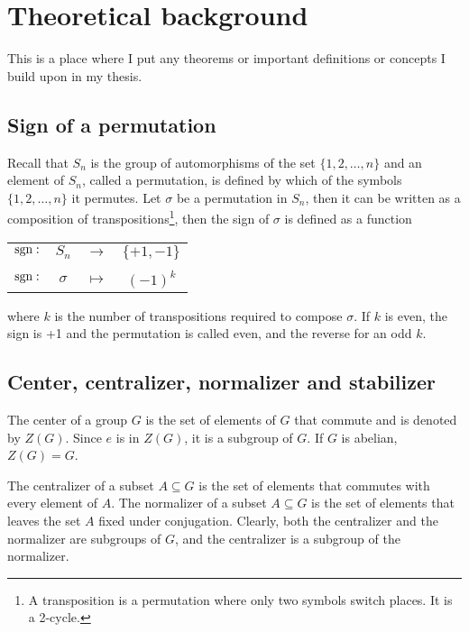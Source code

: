 \clearpage{\thispagestyle{empty}}
\section{Theoretical background}
	
	This is a place where I put any theorems or important definitions or concepts I build upon in my thesis.
	
	\subsection{Sign of a permutation}

		Recall that $S_n$ is the group of automorphisms of the set $\{1, 2, \dots, n\}$ and an element of $S_n$, called a permutation, is defined by which of the symbols $\{1, 2, \dots, n\}$ it permutes. Let $\sigma$ be a permutation in $S_n$, then it can be written as a composition of transpositions\footnote{A transposition is a permutation where only two symbols switch places. It is a 2-cycle.}, then the sign of $\sigma$ is defined as a function
		\begin{table}[hbt!]\centering\begin{tabular}{c c c c}
			$\text{sgn}:$ & $S_n$    & $\rightarrow$ & $\{+1, -1\}$ \\
			&\rotatebox[origin=c]{90}{$\in$}&&\rotatebox[origin=c]{90}{$\in$} \\
			$\text{sgn}:$ & $\sigma$ & $\mapsto$     & $(-1)^k$
		\end{tabular}\end{table}
		where $k$ is the number of transpositions required to compose $\sigma$. If $k$ is even, the sign is +1 and the permutation is called even, and the reverse for an odd $k$.
		
	\subsection{Center, centralizer, normalizer and stabilizer}
	
		\cite{DummitFoote}
	
		\begin{example}[Center]
			The center of a group $G$ is the set of elements of $G$ that commute and is denoted by $Z(G)$. Since $e$ is in $Z(G)$, it is a subgroup of $G$. If $G$ is abelian, $Z(G) = G$.	
		\end{example}
		
		\begin{example}
			The centralizer of a subset $A \subseteq G$ is the set of elements that commutes with every element of $A$.
			The normalizer of a subset $A \subseteq G$ is the set of elements that leaves the set $A$ fixed  under conjugation. Clearly, both the centralizer and the normalizer are subgroups of $G$, and the centralizer is a subgroup of the normalizer.
		\end{example}
		
